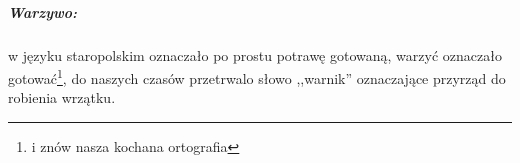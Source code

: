 \documentclass[./KNIGA.tex]{subfiles}
\begin{document}
\subparagraph{Warzywo:}
w języku staropolskim oznaczało po prostu potrawę gotowaną, warzyć oznaczało gotować\footnote{i znów nasza kochana ortografia}, do naszych czasów przetrwalo słowo ,,warnik'' oznaczające przyrząd do robienia wrzątku.
\end{document}
